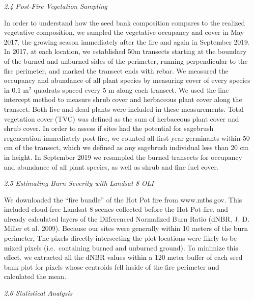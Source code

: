 \documentclass[
  12pt,
]{article}
\begin{document}
\emph{2.4 Post-Fire Vegetation Sampling}

In order to understand how the seed bank composition compares to the
realized vegetative composition, we sampled the vegetative occupancy and
cover in May 2017, the growing season immediately after the fire and
again in September 2019. In 2017, at each location, we established 50m
transects starting at the boundary of the burned and unburned sides of
the perimeter, running perpendicular to the fire perimeter, and marked
the transect ends with rebar. We measured the occupancy and abundance of
all plant species by measuring cover of every species in 0.1 m\(^2\)
quadrats spaced every 5 m along each transect. We used the line
intercept method to measure shrub cover and herbaceous plant cover along
the transect. Both live and dead plants were included in these
measurements. Total vegetation cover (TVC) was defined as the sum of
herbaceous plant cover and shrub cover. In order to assess if sites had
the potential for sagebrush regeneration immediately post-fire, we
counted all first-year germinants within 50 cm of the transect, which we
defined as any sagebrush individual less than 20 cm in height. In
September 2019 we resampled the burned transects for occupancy and
abundance of all plant species, as well as shrub and fine fuel cover.

\emph{2.5 Estimating Burn Severity with Landsat 8 OLI}

We downloaded the ``fire bundle'' of the Hot Pot fire from www.mtbs.gov.
This included cloud-free Landsat 8 scenes collected before the Hot Pot
fire, and already calculated layers of the Differenced Normalized Burn
Ratio (dNBR, J. D. Miller et al. 2009). Because our sites were generally
within 10 meters of the burn perimeter, The pixels directly intersecting
the plot locations were likely to be mixed pixels (i.e.~containing
burned and unburned ground). To minimize this effect, we extracted all
the dNBR values within a 120 meter buffer of each seed bank plot for
pixels whose centroids fell inside of the fire perimeter and calculated
the mean.

\emph{2.6 Statistical Analysis}
\end{document}
